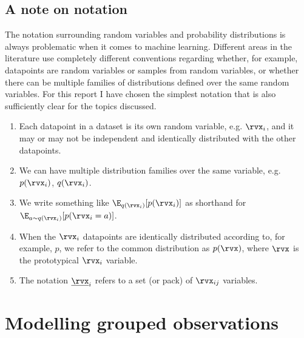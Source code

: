 \documentclass[withindex,glossary,firstyr,times]{cam-thesis}
\begin{document}
\section{A note on notation}
\label{sec:notation}

The notation surrounding random variables and probability distributions is always problematic when it comes to machine learning. Different areas in the literature use completely different conventions regarding whether, for example, datapoints are random variables or samples from random variables, or whether there can be multiple families of distributions defined over the same random variables. For this report I have chosen the simplest notation that is also sufficiently clear for the topics discussed. 
\begin{enumerate}
    \item Each datapoint in a dataset is its own random variable, e.g. $\rvx_{i}$, and it may or may not be independent and identically distributed with the other datapoints.
    \item We can have multiple distribution families over the same variable, e.g. $p(\rvx_{i})$, $q(\rvx_{i})$.
    \item We write something like $\E_{q(\rvx_{i})} [p(\rvx_{i})]$ as shorthand for $\E_{a \sim q(\rvx_{i})} [p(\rvx_{i} = a)]$.
    \item When the $\rvx_i$ datapoints are identically distributed according to, for example, $p$, we refer to the common distribution as $p(\rvx)$, where $\rvx$ is the prototypical $\rvx_i$ variable.
    \item The notation $\underline{\rvx}_i$ refers to a set (or pack) of $\rvx_{ij}$ variables.
\end{enumerate}


\chapter{Modelling grouped observations}
\label{chapter:grouped}


\end{document}
